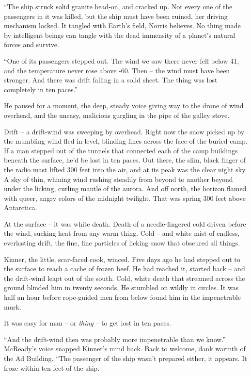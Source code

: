 \documentclass[letterpaper,openany,12pt]{memoir}		%
\begin{document}
``The ship struck solid granite head-on, and cracked up. Not every one of the
passengers in it was killed, but the ship must have been ruined, her driving
mechanism locked. It tangled with Earth's field, Norris believes. No thing made
by intelligent beings can tangle with the dead immensity of a planet's natural
forces and survive.

``One of its passengers stepped out. The wind we saw there never fell below 41,
and the temperature never rose above -60. Then -- the wind must have been
stronger. And there was drift falling in a solid sheet. The thing was lost
completely in ten paces.''

He paused for a moment, the deep, steady voice giving way to the drone of wind
overhead, and the uneasy, malicious gurgling in the pipe of the galley stove.

Drift -- a drift-wind was sweeping by overhead. Right now the snow picked up by
the mumbling wind fled in level, blinding lines across the face of the buried
camp. If a man stepped out of the tunnels that connected each of the camp
buildings beneath the surface, he'd be lost in ten paces. Out there, the slim,
black finger of the radio mast lifted 300 feet into the air, and at its peak was
the clear night sky. A sky of thin, whining wind rushing steadily from beyond to
another beyond under the licking, curling mantle of the aurora. And off north,
the horizon flamed with queer, angry colors of the midnight twilight. That was
spring 300 feet above Antarctica.

At the surface -- it was white death. Death of a needle-fingered cold driven
before the wind, sucking heat from any warm thing. Cold -- and white mist of
endless, everlasting drift, the fine, fine particles of licking snow that
obscured all things.

Kinner, the little, scar-faced cook, winced. Five days ago he had stepped out to
the surface to reach a cache of frozen beef. He had reached it, started back --
and the drift-wind leapt out of the south. Cold, white death that streamed
across the ground blinded him in twenty seconds. He stumbled on wildly in
circles. It was half an hour before rope-guided men from below found him in the
impenetrable murk.

It was easy for man -- or \emph{thing} -- to get lost in ten paces.

``And the drift-wind then was probably more impenetrable than we know.''
McReady's voice snapped Kinner's mind back. Back to welcome, dank warmth of the
Ad Building. ``The passenger of the ship wasn't prepared either, it appears. It
froze within ten feet of the ship.
\end{document}
